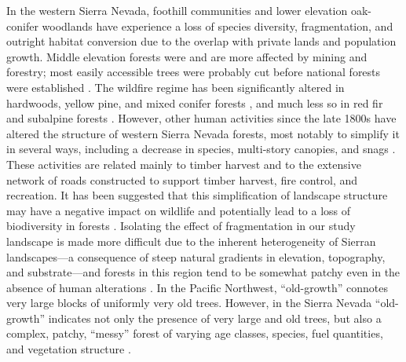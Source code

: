 In the western Sierra Nevada, foothill communities and lower elevation oak-conifer woodlands have experience a loss of species diversity, fragmentation, and outright habitat conversion due to the overlap with private lands and population growth. Middle elevation forests were and are more affected by mining and forestry; most easily accessible trees were probably cut before national forests were established \citep{SNEP1996}. The wildfire regime has been significantly altered in hardwoods, yellow pine, and mixed conifer forests \citep{Merriam2013,Safford2013}, and much less so in red fir and subalpine forests \citep{Meyer2013,Meyer2013a}. However, other human activities since the late 1800s have altered the structure of western Sierra Nevada forests, most notably to simplify it in several ways, including a decrease in species, multi-story canopies, and snags \citep{SNEP1996}. These activities are related mainly to timber harvest and to the extensive network of roads constructed to support timber harvest, fire control, and recreation. It has been suggested that this simplification of landscape structure may have a negative impact on wildlife and potentially lead to a loss of biodiversity in forests \citep{Thompson2003,Manley2004,Hunter2011}. Isolating the effect of fragmentation in our study landscape is made more difficult due to the inherent heterogeneity of Sierran landscapes---a consequence of steep natural gradients in elevation, topography, and substrate---and forests in this region tend to be somewhat patchy even in the absence of human alterations \citep{Franklin1996}. In the Pacific Northwest, ``old-growth'' connotes very large blocks of uniformly very old trees. However, in the Sierra Nevada ``old-growth'' indicates not only the presence of very large and old trees, but also a complex, patchy, ``messy'' forest of varying age classes, species, fuel quantities, and vegetation structure \citep{SNEP1996}.


